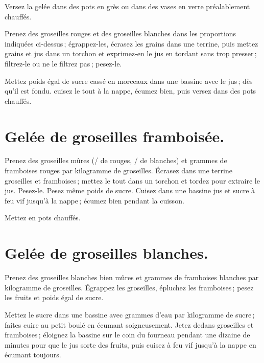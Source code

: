 Versez la gelée dans des pots en grès ou dans des vases en verre préalablement
chauffés.

\sk

Prenez des groseilles rouges et des groseilles blanches dans les proportions
indiquées ci-dessus ; égrappez-les, écrasez les grains dans une terrine, puis
mettez grains et jus dans un torchon et exprimez-en le jus en tordant sans trop
presser ; filtrez-le ou ne le filtrez pas ; pesez-le.

Mettez poids égal de sucre cassé en morceaux dans une bassine avec le jus ; dès
qu'il est fondu. cuisez le tout à la nappe, écumez bien, puis versez dans des
pots chauffés.

\section*{\centering Gelée de groseilles framboisée.}
{}

Prenez des groseilles mûres ({\mmm}/{\mmm} de rouges,
{\mmm}/{\mmm} de blanches) et {\mmm} grammes de framboises
rouges par kilogramme de groseilles. Écrasez dans une terrine groseilles et
framboises ; mettez le tout dans un torchon et tordez pour extraire le jus.
Pesez-le. Pesez même poids de sucre. Cuisez dans une bassine jus et sucre à feu
vif jusqu'à la nappe ; écumez bien pendant la cuisson.

Mettez en pots chauffés.

\section*{\centering Gelée de groseilles blanches.}
{}

Prenez des groseilles blanches bien mûres et {\mmm} grammes de
framboises blanches par kilogramme de groseilles. Égrappez les groseilles,
épluchez les framboises ; pesez les fruits et poids égal de sucre.

Mettez le sucre dans une bassine avec {\mmm} grammes d'eau par
kilogramme de sucre ; faites cuire au petit boulé en écumant soigneusement.
Jetez dedans groseilles et framboises ; éloignez la bassine sur le coin du
fourneau pendant une dizaine de minutes pour que le jus sorte des fruits, puis
cuisez à feu vif jusqu'à la nappe en écumant toujours.


